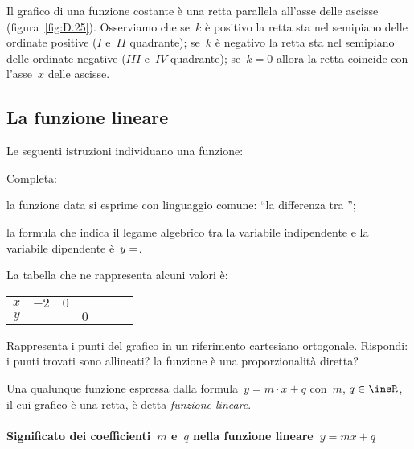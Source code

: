 Il grafico di una funzione costante è una retta parallela all'asse delle ascisse (figura~\ref{fig:D.25}).
Osserviamo che se~$k$ è positivo la retta sta nel semipiano delle ordinate positive ($I$ e~$II$ quadrante);
se~$k$ è negativo la retta sta nel semipiano delle ordinate negative ($III$ e~$IV$ quadrante);
se~$k=0$ allora la retta coincide con l'asse~$x$ delle ascisse.

\vspazio\ovalbox{\risolvii \ref{ese:D.44}, \ref{ese:D.45}, \ref{ese:D.46}, \ref{ese:D.47}}

\subsection{La funzione lineare}

Le seguenti istruzioni individuano una funzione:
\begin{center}
 
\end{center}

Completa:
\begin{itemize*}
\item la funzione data si esprime con linguaggio comune: ``la differenza tra \dotfill'';
\item la formula che indica il legame algebrico tra la variabile indipendente e la variabile dipendente è~$y=\dotfill$.
\end{itemize*}
La tabella che ne rappresenta alcuni valori è:
\begin{center}
 \begin{tabular}{ccccccc}
 \toprule
 $x$ & $-2$ & $0$ & & & & \\
 $y$ & & & $0$ & & & \\
 \bottomrule
 \end{tabular}
\end{center}
Rappresenta i punti del grafico in un riferimento cartesiano ortogonale.
Rispondi: i punti trovati sono allineati? la funzione è una proporzionalità diretta?

\begin{definizione}
Una qualunque funzione espressa dalla formula~$y=m\cdot x+q$ con~$m$, $q\in \insR$, il cui grafico è una retta, è detta
\emph{funzione lineare}.
\end{definizione}

\paragraph{Significato dei coefficienti~$m$ e~$q$ nella funzione lineare~$y = mx+q$}

